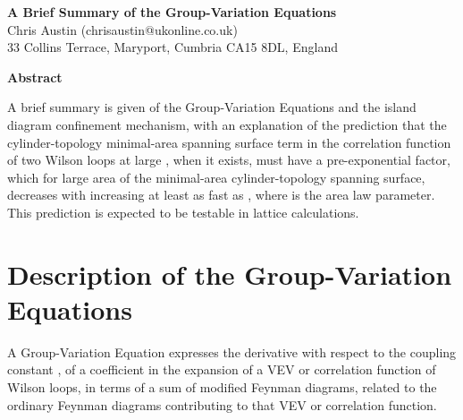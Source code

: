 \documentclass[a4paper,12pt,oneside]{article}
\begin{document}
\begin{center}
{\large\bf A Brief Summary of the Group-Variation Equations\\}
{Chris Austin (chrisaustin@ukonline.co.uk)\\
33 Collins Terrace, Maryport, Cumbria CA15 8DL, England\\
}
\end{center}
\begin{center}
{\bf Abstract}
\end{center}
\noindent A brief summary is given of the Group-Variation Equations and 
the island diagram confinement mechanism, with an explanation of 
the prediction that the cylinder-topology minimal-area spanning surface 
term in the correlation function of two Wilson loops at large \coordHE{}, 
when it exists, must have a pre-exponential factor, which for large area 
\coordHE{} of the minimal-area cylinder-topology spanning surface, decreases 
with increasing \coordHE{} at least as fast as \coordHE{}, where 
\myHighlight{$\sigma$}\coordHE{} is the area law parameter.  This prediction is expected to be 
testable in lattice calculations.

\section{Description of the Group-Variation Equations}

A Group-Variation Equation \cite{GVE} expresses the derivative with respect to the
coupling constant \coordHE{}, of a coefficient in the \coordHE{} expansion \cite{Planar} of a VEV or
correlation function of Wilson loops, in terms of a sum of modified Feynman
diagrams, related to the ordinary Feynman diagrams contributing to that VEV
or correlation function.
\end{document}
